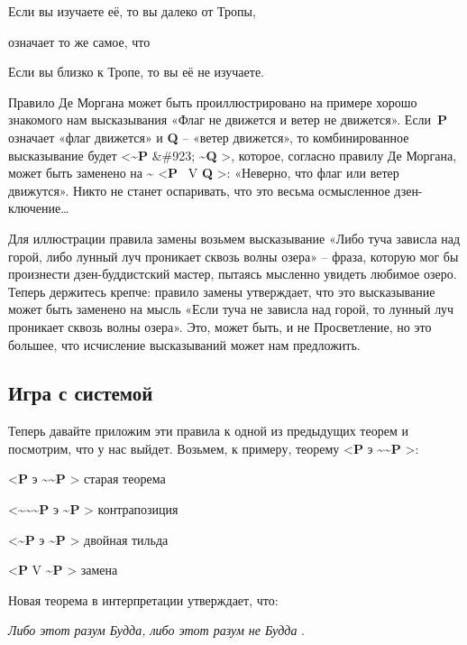 \documentclass[../main.tex]{subfiles}
\begin{document}
Если вы изучаете её, то вы далеко от Тропы,

означает то же самое, что

Если вы близко к Тропе, то вы её не изучаете.

Правило Де Моргана может быть проиллюстрировано на примере хорошо знакомого нам высказывания «Флаг не движется и ветер не движется». Если~\textbf{P} означает «флаг движется» и \textbf{Q} \--- «ветер движется», то комбинированное высказывание будет \textless{}\textbf{\textasciitilde P} \&\#923; \textbf{\textasciitilde Q} \textgreater, которое, согласно правилу Де Моргана, может быть заменено на \textbf{\textasciitilde{}} \textless{}\textbf{P} ~V \textbf{Q} \textgreater: «Неверно, что флаг или ветер движутся». Никто не станет оспаривать, что это весьма осмысленное дзен-ключение\ldots{}

Для иллюстрации правила замены возьмем высказывание «Либо туча зависла над горой, либо лунный луч проникает сквозь волны озера» \--- фраза, которую мог бы произнести дзен-буддистский мастер, пытаясь мысленно увидеть любимое озеро. Теперь держитесь крепче: правило замены утверждает, что это высказывание может быть заменено на мысль «Если туча не зависла над горой, то лунный луч проникает сквозь волны озера». Это, может быть, и не Просветление, но это большее, что исчисление высказываний может нам предложить.


\subsection{Игра с системой}

Теперь давайте приложим эти правила к одной из предыдущих теорем и посмотрим, что у нас выйдет. Возьмем, к примеру, теорему \textless{}\textbf{P} э \textbf{\textasciitilde\textasciitilde P} \textgreater:

\textless{}\textbf{P} э \textbf{\textasciitilde\textasciitilde P} \textgreater{} старая теорема

\textless{}\textbf{\textasciitilde\textasciitilde\textasciitilde P} э \textbf{\textasciitilde P} \textgreater{} контрапозиция

\textless{}\textbf{\textasciitilde P} э \textbf{\textasciitilde P} \textgreater{} двойная тильда

\textless{}\textbf{P} V \textbf{\textasciitilde P} \textgreater{} замена

Новая теорема в интерпретации утверждает, что:

\emph{Либо этот разум Будда, либо этот разум не Будда} .
\end{document}
